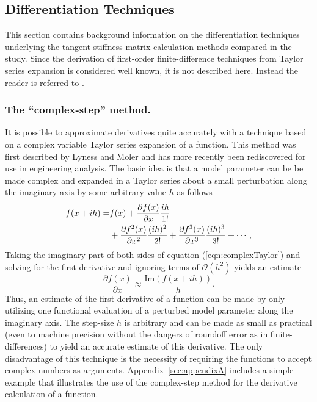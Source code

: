\documentclass[preprint,12pt]{elsarticle}
\begin{document}
\subsection{Differentiation Techniques}

This section contains background information on the differentiation techniques underlying the tangent-stiffness matrix calculation methods compared in the study. Since the derivation of first-order finite-difference techniques from Taylor series expansion is considered well known, it is not described here. Instead the reader is referred to \cite[Chap. 4.1.3]{chapra2010}.

\subsubsection{The ``complex-step'' method.}  \label{sec:CSmethod} It is
possible to approximate derivatives quite accurately with a technique based on
a complex variable Taylor series expansion of a function.  This method was
first described by Lyness and Moler
\cite{lyness1967numerical,lyness1968differentiation} and has more recently been
rediscovered
\cite{squire1998using,voorhees2011complex,al2010complex,martins2000automated}
for use in engineering analysis.  The basic idea is that a model parameter can
be be made complex and expanded in a Taylor series about a small perturbation
along the imaginary axis by some arbitrary value $h$ as follows
%
\begin{align} f ( x + i h ) =& f(x) + \frac{\partial f(x)}{\partial x} \frac{i
h}{1!}  \notag \\ &+ \frac{\partial f^2(x)}{\partial x^2} \frac{(i h)^2}{2!} +
\frac{\partial f^3(x)}{\partial x^3} \frac{(i h)^3}{3!} + \cdots,
\label{eqn:complexTaylor} \end{align}
%
Taking the imaginary part of both sides of equation (\ref{eqn:complexTaylor})
and solving for the first derivative and ignoring terms of $\mathcal{O}\left (
h^2 \right)$ yields an estimate
%
\begin{equation} \frac{\partial f( x )}{\partial x} \approx \frac{\mbox{Im}
\left( f (x + i h) \right)}{h}.  \label{eqn:complexFirstDeriv} \end{equation}
%
Thus, an estimate of the first derivative of a function can be made by only
utilizing one functional evaluation of a perturbed model parameter along the
imaginary axis.  The step-size $h$ is arbitrary and can be made as small as
practical (even to machine precision without the dangers of roundoff error as
in finite-differences) to yield an accurate estimate of this derivative.  The
only disadvantage of this technique is the necessity of requiring the functions
to accept complex numbers as arguments. Appendix~\ref{sec:appendixA} includes a
simple example that illustrates the use of the complex-step method for the
derivative calculation of a function. 
\end{document}
